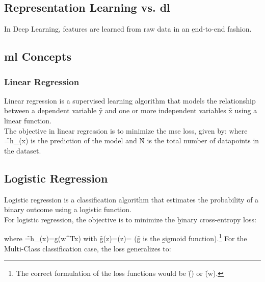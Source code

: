 \subsection{Representation Learning vs. \ac{dl}}

In Deep Learning, features are learned from raw data in an \b{end-to-end} fashion.

\subsection{\ac{ml} Concepts}
\subsubsection{Linear Regression}
Linear regression is a supervised learning algorithm that models the relationship between a dependent variable \f{y} and one or more independent variables \f{x} using a linear function.\\

The objective in linear regression is to minimize the \b{\ac{mse}} loss, given by:
where \f{=h_{\theta}(x)} is the prediction of the model and \f{N} is the total number of datapoints in the dataset.

\subsection{Logistic Regression}
Logistic regression is a classification algorithm that estimates the probability of a binary outcome using a logistic function.\\

For logistic regression, the objective is to minimize the \b{binary cross-entropy} loss:

where \f{=h_{\theta}(x)=g(w^Tx)} with \f{g(z)=\sigma(z)=} (\f{g} is the \b{sigmoid} function).\footnote{The correct formulation of the loss functions would be \f{\fL(\theta)} or \f{\fL(w)}.} For the Multi-Class classification case, the loss generalizes to:


